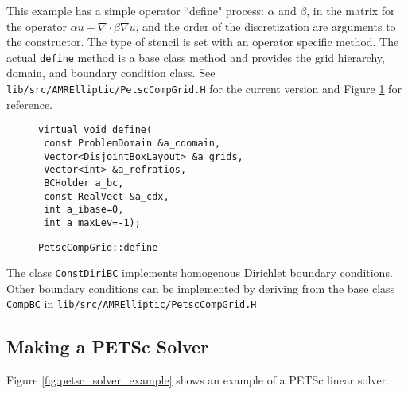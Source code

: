 This example has a simple operator ``define" process: $\alpha$ and $\beta$, in the matrix for the operator $\alpha u + \nabla\cdot\beta\nabla u$, and the order of the discretization are arguments to the constructor.
The type of stencil is set with an operator specific method.
The actual \texttt{define} method is a base class method and provides the grid hierarchy, domain, and boundary condition class.
See \texttt{lib/src/AMRElliptic/PetscCompGrid.H} for the current version and Figure \ref{fig:define} for reference.
\begin{figure}[h]
\begin{flushleft}
  \texttt{virtual void define( } \\
  \texttt{                               const ProblemDomain \&a\_cdomain,} \\
  \texttt{                               Vector<DisjointBoxLayout> \&a\_grids, } \\
  \texttt{                               Vector<int> \&a\_refratios, } \\
  \texttt{                               BCHolder a\_bc,} \\
 \texttt{                               const RealVect \&a\_cdx,} \\
 \texttt{                               int a\_ibase=0,} \\
 \texttt{                               int a\_maxLev=-1);} \\
 \caption{\texttt{PetscCompGrid::define}}
\label{fig:define}
\end{flushleft}
\end{figure}
The class \texttt{ConstDiriBC} implements homogenous Dirichlet boundary conditions.
Other boundary conditions can be implemented by deriving from the base class \texttt{CompBC} in \texttt{lib/src/AMRElliptic/PetscCompGrid.H}

\subsection{Making a PETSc Solver}
\label{sec:petsc_solver}

Figure \ref{fig:petsc_solver_example} shows an example of a PETSc linear solver. 

